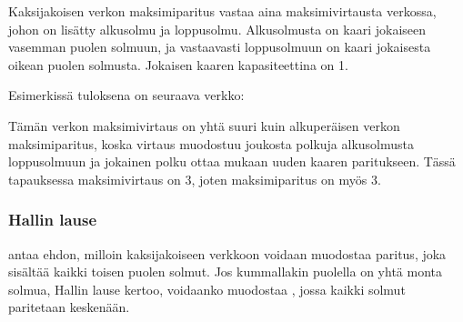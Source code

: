 Kaksijakoisen verkon maksimiparitus
vastaa aina maksimivirtausta verkossa,
johon on lisätty alkusolmu ja loppusolmu.
Alkusolmusta on kaari jokaiseen vasemman
puolen solmuun, ja vastaavasti loppusolmuun
on kaari jokaisesta oikean puolen solmusta.
Jokaisen kaaren kapasiteettina on 1.

Esimerkissä tuloksena on seuraava verkko:

\begin{center}
\end{center}

Tämän verkon maksimivirtaus on yhtä suuri kuin
alkuperäisen verkon maksimiparitus,
koska virtaus muodostuu joukosta polkuja
alkusolmusta loppusolmuun ja jokainen
polku ottaa mukaan uuden kaaren paritukseen.
Tässä tapauksessa maksimivirtaus on 3,
joten maksimiparitus on myös 3.

\subsubsection{Hallin lause}


 antaa ehdon, milloin kaksijakoiseen
verkkoon voidaan muodostaa paritus,
joka sisältää kaikki toisen puolen solmut.
Jos kummallakin puolella on yhtä monta solmua,
Hallin lause kertoo, voidaanko muodostaa
,
jossa kaikki solmut paritetaan keskenään.

